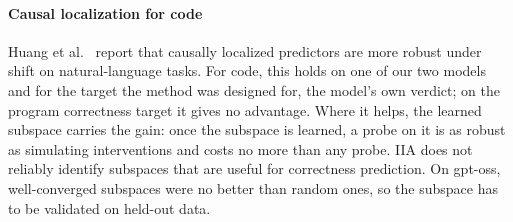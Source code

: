\paragraph{Causal localization for code}
Huang et al.~\cite{Huang2025Internal} report that causally localized
predictors are more robust under shift on natural-language tasks. For code,
this holds on one of our two models and for the target the method was
designed for, the model's own verdict; on the program correctness target it gives no
advantage. Where it helps, the learned subspace carries the gain: once the subspace is
learned, a probe on it is as robust as simulating interventions and costs no
more than any probe. IIA does not reliably identify subspaces that are useful for correctness prediction. On gpt-oss, well-converged subspaces were no better than random ones, so the
subspace has to be validated on held-out data.
